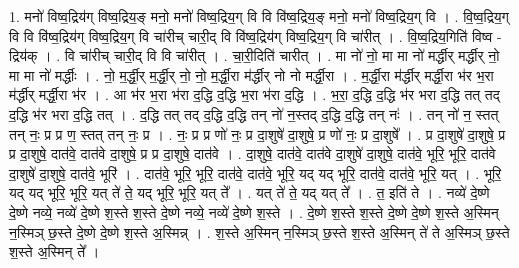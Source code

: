 \documentclass[17pt]{extarticle}
\begin{document}
1. मनो॑ विष्व॒द्रिय॑ग् विष्व॒द्रिय॒ङ् मनो॒ मनो॑ विष्व॒द्रिय॒ग् वि वि वि॑ष्व॒द्रिय॒ङ् मनो॒ मनो॑ विष्व॒द्रिय॒ग् वि । . वि॒ष्व॒द्रिय॒ग् वि वि वि॑ष्व॒द्रिय॑ग् विष्व॒द्रिय॒ग् वि चा॑रीच् चारी॒द् वि वि॑ष्व॒द्रिय॑ग् विष्व॒द्रिय॒ग् वि चा॑रीत् । . वि॒ष्व॒द्रिय॒गिति॑ विष्व - द्रिय॑क् । . वि चा॑रीच् चारी॒द् वि वि चा॑रीत् । . चा॒री॒दिति॑ चारीत् । . मा नो॑ नो॒ मा मा नो॑ मर्द्धीर् मर्द्धीर् नो॒ मा मा नो॑ मर्द्धीः । . नो॒ म॒र्द्धी॒र् म॒र्द्धी॒र् नो॒ नो॒ म॒र्द्धी॒रा म॑र्द्धीर् नो नो मर्द्धी॒रा । . म॒र्द्धी॒रा म॑र्द्धीर् मर्द्धी॒रा भ॑र भ॒रा म॑र्द्धीर् मर्द्धी॒रा भ॑र । . आ भ॑र भ॒रा भ॑रा द॒द्धि द॒द्धि भ॒रा भ॑रा द॒द्धि । . भ॒रा॒ द॒द्धि द॒द्धि भ॑र भरा द॒द्धि तत् तद् द॒द्धि भ॑र भरा द॒द्धि तत् । . द॒द्धि तत् तद् द॒द्धि द॒द्धि तन् नो॑ न॒स्तद् द॒द्धि द॒द्धि तन् नः॑ । . तन् नो॑ न॒ स्तत् तन् नः॒ प्र प्र ण॒ स्तत् तन् नः॒ प्र । . नः॒ प्र प्र णो॑ नः॒ प्र दा॒शुषे॑ दा॒शुषे॒ प्र णो॑ नः॒ प्र दा॒शुषे᳚ । . प्र दा॒शुषे॑ दा॒शुषे॒ प्र प्र दा॒शुषे॒ दात॑वे॒ दात॑वे दा॒शुषे॒ प्र प्र दा॒शुषे॒ दात॑वे । . दा॒शुषे॒ दात॑वे॒ दात॑वे दा॒शुषे॑ दा॒शुषे॒ दात॑वे॒ भूरि॒ भूरि॒ दात॑वे दा॒शुषे॑ दा॒शुषे॒ दात॑वे॒ भूरि॑ । . दात॑वे॒ भूरि॒ भूरि॒ दात॑वे॒ दात॑वे॒ भूरि॒ यद् यद् भूरि॒ दात॑वे॒ दात॑वे॒ भूरि॒ यत् । . भूरि॒ यद् यद् भूरि॒ भूरि॒ यत् ते॑ ते॒ यद् भूरि॒ भूरि॒ यत् ते᳚ । . यत् ते॑ ते॒ यद् यत् ते᳚ । . त॒ इति॑ ते । . नव्ये॑ दे॒ष्णे दे॒ष्णे नव्ये॒ नव्ये॑ दे॒ष्णे श॒स्ते श॒स्ते दे॒ष्णे नव्ये॒ नव्ये॑ दे॒ष्णे श॒स्ते । . दे॒ष्णे श॒स्ते श॒स्ते दे॒ष्णे दे॒ष्णे श॒स्ते अ॒स्मिन् न॒स्मिञ् छ॒स्ते दे॒ष्णे दे॒ष्णे श॒स्ते अ॒स्मिन्न् । . श॒स्ते अ॒स्मिन् न॒स्मिञ् छ॒स्ते श॒स्ते अ॒स्मिन् ते॑ ते अ॒स्मिञ् छ॒स्ते श॒स्ते अ॒स्मिन् ते᳚ । \newline
\end{document}

